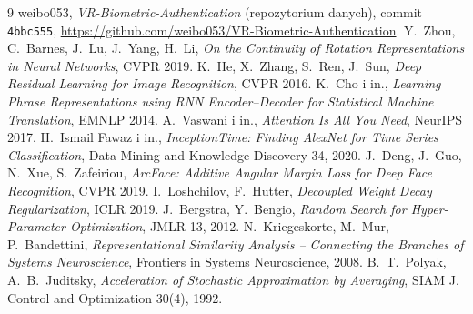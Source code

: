 \documentclass[11pt,a4paper]{article}
\newcommand{\code}[1]{\texttt{#1}}
\begin{document}
\begin{thebibliography}{9}\small
{} weibo053, \emph{VR-Biometric-Authentication} (repozytorium danych), commit
  \code{4bbc555}, \url{https://github.com/weibo053/VR-Biometric-Authentication}.
 Y.~Zhou, C.~Barnes, J.~Lu, J.~Yang, H.~Li, \emph{On the Continuity of Rotation
  Representations in Neural Networks}, CVPR 2019.
 K.~He, X.~Zhang, S.~Ren, J.~Sun, \emph{Deep Residual Learning for Image
  Recognition}, CVPR 2016.
 K.~Cho i in., \emph{Learning Phrase Representations using RNN Encoder--Decoder for
  Statistical Machine Translation}, EMNLP 2014.
 A.~Vaswani i in., \emph{Attention Is All You Need}, NeurIPS 2017.
 H.~Ismail Fawaz i in., \emph{InceptionTime: Finding AlexNet for Time Series
  Classification}, Data Mining and Knowledge Discovery 34, 2020.
 J.~Deng, J.~Guo, N.~Xue, S.~Zafeiriou, \emph{ArcFace: Additive Angular Margin Loss
  for Deep Face Recognition}, CVPR 2019.
 I.~Loshchilov, F.~Hutter, \emph{Decoupled Weight Decay Regularization}, ICLR 2019.
 J.~Bergstra, Y.~Bengio, \emph{Random Search for Hyper-Parameter
  Optimization}, JMLR 13, 2012.
 N.~Kriegeskorte, M.~Mur, P.~Bandettini, \emph{Representational Similarity Analysis --
  Connecting the Branches of Systems Neuroscience}, Frontiers in Systems Neuroscience, 2008.
 B.~T.~Polyak, A.~B.~Juditsky, \emph{Acceleration of Stochastic Approximation by
  Averaging}, SIAM J. Control and Optimization 30(4), 1992.
\end{thebibliography}
\end{document}
